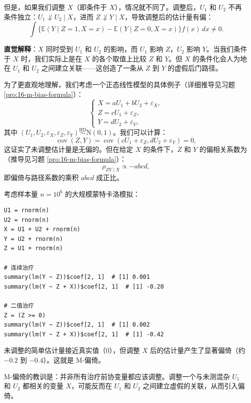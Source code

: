 但是，如果我们调整 $X$（即条件于 $X$），情况就不同了。调整后，$U_1$ 和 $U_2$ 不再条件独立：$U_1 \not\perp U_2 \mid X$，进而 $Z \not\perp Y \mid X$，导致调整后的估计量有偏：
\[
\int \{ \mathbb{E}(Y \mid Z = 1, X = x) - \mathbb{E}(Y \mid Z = 0, X = x) \} f(x) \, dx \neq 0 .
\label{eq:16-adjusted-bias}
\tag{16.10}
\]

\textbf{直觉解释}：$X$ 同时受到 $U_1$ 和 $U_2$ 的影响，而 $U_1$ 影响 $Z$，$U_2$ 影响 $Y$。当我们条件于 $X$ 时，我们实际上是在 $X$ 的各个取值上比较 $Z$ 和 $Y$。但 $X$ 的条件化会人为地在 $U_1$ 和 $U_2$ 之间建立关联——这创造了一条从 $Z$ 到 $Y$ 的虚假后门路径。

为了更直观地理解，我们考虑一个正态线性模型的具体例子（详细推导见习题 \ref{pro:16-m-bias-formula}）：
\[
\begin{cases}
X = a U_1 + b U_2 + \varepsilon_X, \\
Z = c U_1 + \varepsilon_Z, \\
Y = d U_2 + \varepsilon_Y,
\end{cases}
\label{eq:16-m-bias-normal}
\tag{16.11}
\]
其中 $(U_1, U_2, \varepsilon_X, \varepsilon_Z, \varepsilon_Y) \stackrel{\mathrm{IID}}{\sim} \mathrm{N}(0, 1)$。我们可以计算：
\[
\operatorname{cov}(Z, Y) = \operatorname{cov}(c U_1 + \varepsilon_Z, d U_2 + \varepsilon_Y) = 0 ,
\label{eq:16-m-bias-cov}
\tag{16.12}
\]
这证实了未调整估计量是无偏的。但在给定 $X$ 的条件下，$Z$ 和 $Y$ 的偏相关系数为（推导见习题 \ref{pro:16-m-bias-formula}）：
\[
\rho_{ZY \mid X} \propto - a b c d ,
\label{eq:16-partial-corr}
\tag{16.13}
\]
即偏倚与路径系数的乘积 $abcd$ 成正比。

\begin{Example}[M-偏倚的数值演示]\label{ex:16-m-bias-simulation}
考虑样本量 $n = 10^6$ 的大规模蒙特卡洛模拟：
\begin{verbatim}
U1 = rnorm(n)
U2 = rnorm(n)
X = U1 + U2 + rnorm(n)
Y = U2 + rnorm(n)
Z = U1 + rnorm(n)

# 连续治疗
summary(lm(Y ~ Z))$coef[2, 1]  # [1] 0.001
summary(lm(Y ~ Z + X))$coef[2, 1]  # [1] -0.20

# 二值治疗
Z = (Z >= 0)
summary(lm(Y ~ Z))$coef[2, 1]  # [1] 0.002
summary(lm(Y ~ Z + X))$coef[2, 1]  # [1] -0.42
\end{verbatim}
未调整的简单估计量接近真实值（0），但调整 $X$ 后的估计量产生了显著偏倚（约 $-0.2$ 到 $-0.4$）。这就是 M-偏倚。
\end{Example}

M-偏倚的教训是：并非所有治疗前协变量都应该调整。调整一个与未测混杂 $U_1$ 和 $U_2$ 都相关的变量 $X$，可能反而在 $U_1$ 和 $U_2$ 之间建立虚假的关联，从而引入偏倚。

